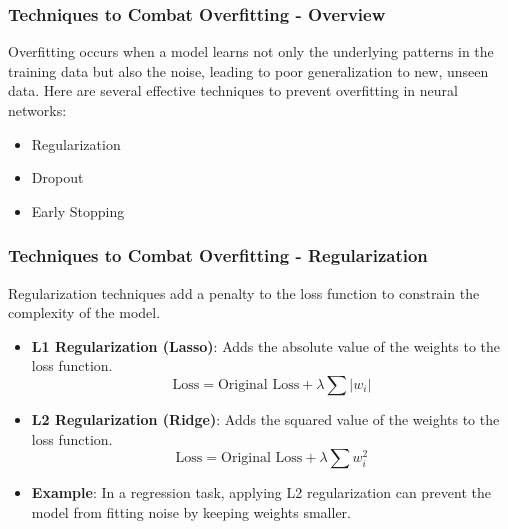 \documentclass[aspectratio=169]{beamer}
\begin{document}
\begin{frame}[fragile]
    \frametitle{Techniques to Combat Overfitting - Overview}
    Overfitting occurs when a model learns not only the underlying patterns in the training data but also the noise, leading to poor generalization to new, unseen data. Here are several effective techniques to prevent overfitting in neural networks:
    
    \begin{itemize}
        \item Regularization
        \item Dropout
        \item Early Stopping
    \end{itemize}
\end{frame}

\begin{frame}[fragile]
    \frametitle{Techniques to Combat Overfitting - Regularization}
    Regularization techniques add a penalty to the loss function to constrain the complexity of the model.
    
    \begin{itemize}
        \item \textbf{L1 Regularization (Lasso)}: 
        Adds the absolute value of the weights to the loss function.
        \begin{equation}
        \text{Loss} = \text{Original Loss} + \lambda \sum |w_i|
        \end{equation}
        
        \item \textbf{L2 Regularization (Ridge)}: 
        Adds the squared value of the weights to the loss function.
        \begin{equation}
        \text{Loss} = \text{Original Loss} + \lambda \sum w_i^2
        \end{equation}
        
        \item \textbf{Example}: In a regression task, applying L2 regularization can prevent the model from fitting noise by keeping weights smaller.
    \end{itemize}
\end{frame}
\end{document}
